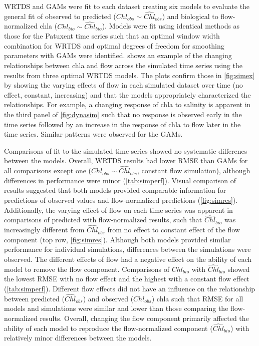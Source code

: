 \documentclass[letterpaper,12pt,oneside]{article}\usepackage[]{graphicx}\usepackage[]{color}
\begin{document}
\ac{WRTDS} and \acp{GAM} were fit to each dataset creating six models to evaluate the general fit of observed to predicted ($Chl_{obs} \sim \widehat{Chl}_{obs}$) and biological to flow-normalized \ac{chla} ($Chl_{bio} \sim \widehat{Chl}_{bio}$).  Models were fit using identical methods as those for the Patuxent time series such that an optimal window width combination for \ac{WRTDS} and optimal degrees of freedom for smoothing parameters with \acp{GAM} were identified.   shows an example of the changing relationships between \ac{chla} and flow across the simulated time series using the results from three optimal \ac{WRTDS} models.  The plots confirm those in \cref{fig:simex} by showing the varying effects of flow in each simulated dataset over time (no effect, constant, increasing) and that the models appropriately characterized the relationships.  For example, a changing response of \ac{chla} to salinity is apparent in the third panel of \cref{fig:dynasim} such that no response is observed early in the time series followed by an increase in the response of \ac{chla} to flow later in the time series.  Similar patterns were observed for the \acp{GAM}.

Comparisons of fit to the simulated time series showed no systematic differenes between the models.  Overall, \ac{WRTDS} results had lower \ac{RMSE} than \acp{GAM} for all comparisons except one ($Chl_{obs} \sim \widehat{Chl}_{obs}$, constant flow simulation), although differences in performance were minor (\cref{tab:simperf}).  Visual comparison of results suggested that both models provided comparable information for predictions of observed values and flow-normalized predictions (\cref{fig:simres}).  Additionally, the varying effect of flow on each time series was apparent in comparisons of predicted with flow-normalized results, such that $\widehat{Chl}_{bio}$ was increasingly different from $\widehat{Chl}_{obs}$ from no effect to constant effect of the flow component (top row, \cref{fig:simres}).  Although both models provided similar performance for individual simulations, differences between the simulations were observed.  The different effects of flow had a negative effect on the ability of each model to remove the flow component.  Comparisons of $Chl_{bio}$ with $\widehat{Chl}_{bio}$ showed the lowest \ac{RMSE} with no flow effect and the highest with a constant flow effect (\cref{tab:simperf}).  Different flow effects did not have an influence on the relationship between predicted ($\widehat{Chl}_{obs}$) and observed ($Chl_{obs}$) \ac{chla} such that \ac{RMSE} for all models and simulations were similar and lower than those comparing the flow-normalized results.  Overall, changing the flow component primarily affected the ability of each model to reproduce the flow-normalized component ($\widehat{Chl}_{bio}$) with relatively minor differences between the models. 
\end{document}
